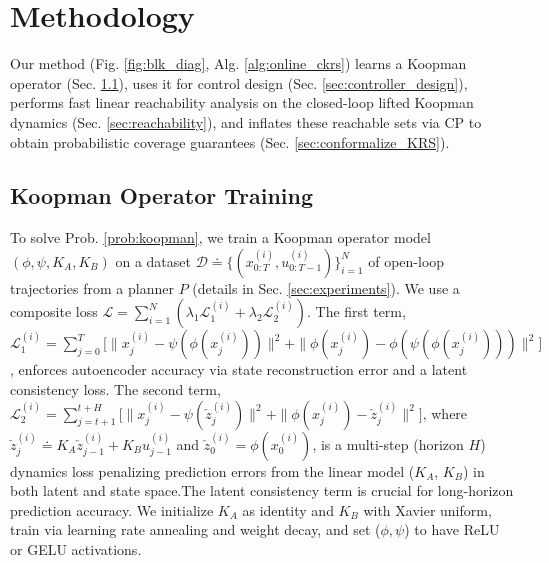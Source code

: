\documentclass{l4dc2026}
\begin{document}
\section{Methodology}
\label{methodology}

Our method (Fig. \ref{fig:blk_diag}, Alg. \ref{alg:online_ckrs}) learns a Koopman operator (Sec. \ref{sec:koop_train}), uses it for control design (Sec. \ref{sec:controller_design}), performs fast linear reachability analysis on the closed-loop lifted Koopman dynamics (Sec. \ref{sec:reachability}), and inflates these reachable sets via CP to obtain probabilistic coverage guarantees (Sec. \ref{sec:conformalize_KRS}).

\subsection{Koopman Operator Training}
\label{sec:koop_train}
To solve Prob. \ref{prob:koopman}, we train a Koopman operator model $(\phi, \psi, K_{A}, K_{B})$ on a dataset $\mathcal{D} \doteq \{(x_{0:T}^{(i)}, u_{0:T-1}^{(i)})\}_{i=1}^N$ of open-loop trajectories from a planner $P$ (details in Sec. \ref{sec:experiments}). We use a composite loss $\mathcal{L} = \sum_{i=1}^N(\lambda_1 \mathcal{L}_1^{(i)} + \lambda_2 \mathcal{L}_2^{(i)})$. The first term, $\mathcal{L}_{\text{1}}^{(i)} = \sum_{j=0}^{T} \big[\|x_{j}^{(i)} - \psi (\phi (x_{j}^{(i)}))\|^2 + \|\phi(x_j^{(i)}) - \phi(\psi(\phi(x_j^{(i)})))\|^2\big]$, enforces autoencoder accuracy via state reconstruction error and a latent consistency loss. The second term, $\mathcal{L}_{\text{2}}^{(i)} = \sum_{j=t+1}^{t+H} \big[\| x_{j}^{(i)} - \psi (\check z_{j}^{(i)})\|^2 + \|\phi (x_{j}^{(i)}) - \check z_j^{(i)}\|^2\big]$, where $\check z_j^{(i)} \doteq K_{A} \check z_{j-1}^{(i)} + K_{B} u_{j-1}^{(i)}$ and $\check z_0^{(i)}=\phi(x_0^{(i)})$, is a multi-step (horizon $H$) dynamics loss penalizing prediction errors from the linear model ($K_{A}$, $K_{B}$) in both latent and state space.The latent consistency term is crucial for long-horizon prediction accuracy. We initialize $K_{A}$ as identity and $K_{B}$ with Xavier uniform, train via learning rate annealing and weight decay, and set ($\phi, \psi$) to have ReLU or GELU activations.
\end{document}
